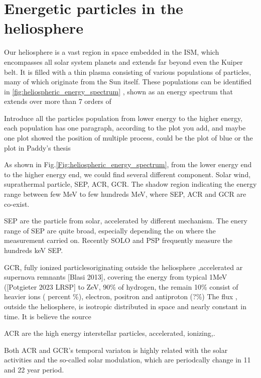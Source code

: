 \section{Energetic particles in the heliosphere}
\label{sec:particles_heliosphere}


Our heliosphere is a vast region in space embedded in the \ac{ISM}, which encompasses all solar system planets and extends far beyond even the Kuiper belt. 
It is filled with a thin plasma consisting of various populations of particles, many of which originate from the Sun itself. These populations can be identified in \autoref{fig:heliospheric_energy_spectrum} \citep[based on measurements by][]{Mewaldt-2001}, shown as an energy spectrum that extends over more than 7 orders of 


Introduce all the particles population from lower energy to the higher energy, each population has one paragraph, according to the plot you add, and maybe one plot showed the position of multiple process, could be the plot of blue or the plot in Paddy's thesis

As shown in Fig.\ref{Fig:heliospheric_energy_spectrum}, from the lower energy end to the higher energy end, we could find several different component. Solar wind, suprathermal particle, SEP, ACR, GCR. 
The shadow region indicating the energy range between few MeV to few hundreds MeV, where SEP, ACR and GCR are co-exist. 


SEP are the particle from solar, accelerated by different mechanism.
The enery range of SEP are quite broad, especially depending the on where the measurement carried on. Recently SOLO and PSP frequently measure the hundreds keV SEP.



GCR, fully ionized particlesoriginating outside the heliosphere ,accelerated ar supernova remnants [Blasi 2013], covering the energy from typical 1MeV ([Potgieter 2023 LRSP] to ZeV, 90\% of hydrogen, the remain 10\% consist of heavier ions ( percent \%), electron, positron and antiproton (?\%)
The flux , outside the heliosphere,  is isotropic distributed in space and nearly constant in time.  It is believe the source 

ACR are the high energy interstellar particles, accelerated, ionizing,. 


Both ACR and GCR's temporal variaton is highly related with the solar activities and the so-called solar modulation, which are periodcally change in 11 and 22 year period. 

